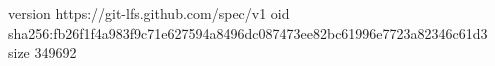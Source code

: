 version https://git-lfs.github.com/spec/v1
oid sha256:fb26f1f4a983f9c71e627594a8496dc087473ee82bc61996e7723a82346c61d3
size 349692
